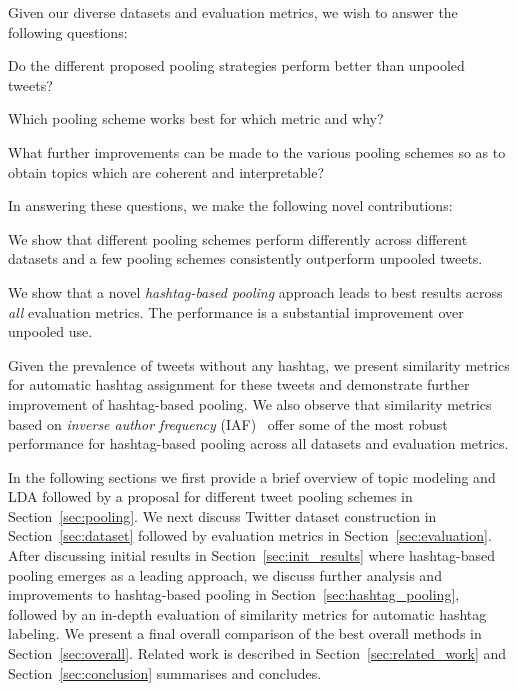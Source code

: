 \documentclass[10pt,a5paper,twoside]{article}
\begin{document}
Given our diverse datasets and evaluation metrics, we wish to answer
the following questions:
\begin{compactitem}
\item Do the different proposed pooling strategies perform better than
  unpooled tweets?
\item Which pooling scheme works best for which metric and why?
\item What further improvements can be made to the various pooling schemes
  so as to obtain topics which are coherent and interpretable?
\end{compactitem}
In answering these questions, we make the following novel
contributions:
\begin{compactitem}
\item We show that different pooling schemes perform differently
  across different datasets and a few pooling schemes consistently
  outperform unpooled tweets.
\item We show that a novel \emph{hashtag-based pooling} approach leads
  to best results across \emph{all} evaluation metrics.  The
  performance is a substantial improvement over unpooled use.
\item Given the prevalence of tweets without any hashtag, we present
  similarity metrics for automatic hashtag assignment for these tweets and
  demonstrate further improvement of hashtag-based pooling.  
  We also observe that 
  similarity metrics based on \emph{inverse author frequency}
  (IAF)~\cite{iaf} offer some of the most robust performance for 
  hashtag-based pooling across all datasets and evaluation metrics.
\end{compactitem}

In the following sections we first provide a brief overview of topic
modeling and LDA followed by a proposal for different tweet pooling
schemes in Section~\ref{sec:pooling}.  We next discuss Twitter dataset
construction in Section~\ref{sec:dataset} followed by evaluation
metrics in Section~\ref{sec:evaluation}.  After discussing initial
results in Section~\ref{sec:init_results} where hashtag-based pooling
emerges as a leading approach, we discuss further analysis and
improvements to hashtag-based pooling in
Section~\ref{sec:hashtag_pooling}, followed by an in-depth evaluation
of similarity metrics for automatic hashtag labeling.  We present a
final overall comparison of the best overall methods in
Section~\ref{sec:overall}.  Related work is described in
Section~\ref{sec:related_work} and Section~\ref{sec:conclusion}
summarises and concludes.
\end{document}

